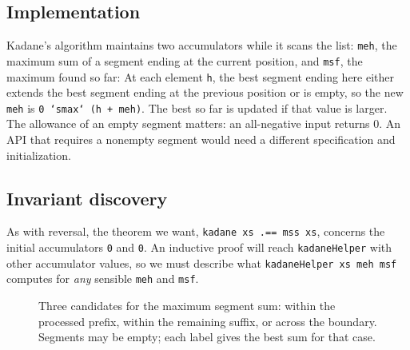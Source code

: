 \documentclass[review]{jfp-epi}
\newcommand{\code}[1]{\texttt{#1}}
\begin{document}
\subsection{Implementation}

Kadane's algorithm maintains two accumulators while it scans the list:
\code{meh}, the maximum sum of a segment ending at the current position, and
\code{msf}, the maximum found so far:
At each element \code{h}, the best segment ending here either extends the best
segment ending at the previous position or is empty, so the new \code{meh} is
\code{0 `smax` (h + meh)}. The best so far is updated if that value is larger.
The allowance of an empty segment matters: an all-negative input returns 0.
An API that requires a nonempty segment would need a different specification
and initialization.

\subsection{Invariant discovery}

As with reversal, the theorem we want, \code{kadane xs .== mss xs}, concerns the
initial accumulators \code{0} and \code{0}. An inductive proof will reach
\code{kadaneHelper} with other accumulator values, so we must describe what
\code{kadaneHelper xs meh msf} computes for \emph{any} sensible \code{meh} and
\code{msf}.

\begin{figure}[htbp]
\centering
{}
\caption{Three candidates for the maximum segment sum: within the processed
prefix, within the remaining suffix, or across the boundary. Segments may be
empty; each label gives the best sum for that case.}
\label{fig:kadane}
\end{figure}
\end{document}
